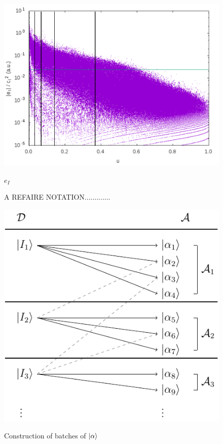 \documentclass[./thesis.tex]{subfiles}
\begin{document}
\begin{figure}[h!]
	\begin{center}
		\includegraphics[width=0.9\columnwidth]{figures/pt2/eici2comb}
		\caption{A REFAIRE NOTATION.............}
		\label{fig:eici2comb}
		$e_I$
	\end{center}
\end{figure}




\begin{figure}[h!]
	\begin{center}
		\includegraphics[width=0.5\columnwidth]{figures/pt2/a_sample}
		\caption{}
		\label{fig:a_sample}
		Construction of batches of $\ket \alpha$
	\end{center}
\end{figure}

\clearpage
\end{document}
